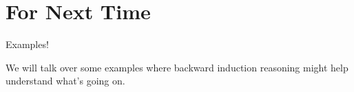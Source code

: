 \documentclass[ignorenonframetext,]{beamer}
\renewcommand{\,}{\text{, }}
\begin{document}
\hypertarget{for-next-time}{%
\section{For Next Time}\label{for-next-time}}

\begin{frame}{Examples!}
\protect\hypertarget{examples}{}

We will talk over some examples where backward induction reasoning might
help understand what's going on.

\end{frame}
\end{document}
